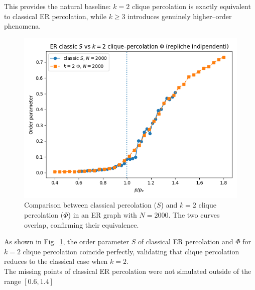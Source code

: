 \noindent This provides the natural baseline: $k=2$ clique percolation is exactly equivalent to 
classical ER percolation, while $k \geq 3$ introduces genuinely higher–order phenomena.

\begin{figure}[H]
    \centering
    \includegraphics[width=0.55\linewidth]{images/IMAGES TASK2/ER_classic_vs_k2_N2000.png}
    \caption{Comparison between classical percolation ($S$) and $k=2$ clique percolation 
    ($\Phi$) in an ER graph with $N=2000$. The two curves overlap, confirming their equivalence.}
    \label{fig:ER_k2}
\end{figure}

\noindent As shown in Fig.~\ref{fig:ER_k2}, the order parameter $S$ of classical ER percolation and 
$\Phi$ for $k=2$ clique percolation coincide perfectly, validating that clique percolation 
reduces to the classical case when $k=2$.\\
The missing points of classical ER percolation were not simulated outside of the range $[0.6, 1.4]$
